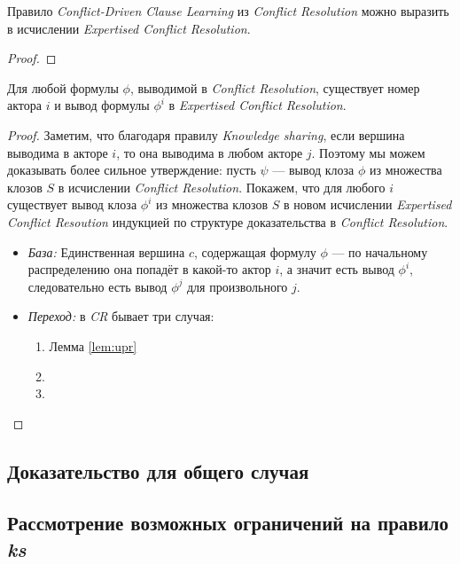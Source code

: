 \begin{lemma}
Правило \emph{Conflict-Driven Clause Learning} из \emph{Conflict Resolution} можно выразить в исчислении \emph{Expertised Conflict Resolution}.
\end{lemma}
\begin{proof}

\end{proof}

\begin{theorem}
Для любой формулы $\phi$, выводимой в \emph{Conflict Resolution}, существует номер актора $i$ и вывод формулы $\phi^i$ в \emph{Expertised Conflict Resolution}.
\end{theorem}
\begin{proof}
Заметим, что благодаря правилу \emph{Knowledge sharing}, если вершина выводима в акторе $i$, то она выводима в любом акторе $j$. Поэтому мы можем доказывать более сильное утверждение:
пусть $\psi$ --- вывод клоза $\phi$ из множества клозов $S$ в исчислении \emph{Conflict Resolution}. Покажем, что для любого $i$ существует вывод клоза $\phi^i$ из множества клозов $S$ в новом исчислении \emph{Expertised Conflict Resoution} индукцией по структуре доказательства в \emph{Conflict Resolution}.

\begin{itemize}[label=$\star$] 
\item \emph{База:} Единственная вершина $c$, содержащая формулу $\phi$ --- по начальному распределению она попадёт в какой-то актор $i$, а значит есть вывод $\phi^i$, следовательно есть вывод $\phi^j$ для произвольного $j$.
\item \emph{Переход:} в \emph{CR} бывает три случая:
\begin{enumerate}
	\item Лемма \ref{lem:upr}
    \item 
    \item
\end{enumerate}
\end{itemize}
\end{proof}

\subsection{Доказательство для общего случая}

\subsection{Рассмотрение возможных ограничений на правило \emph{ks}}
\label{sec:restr}


